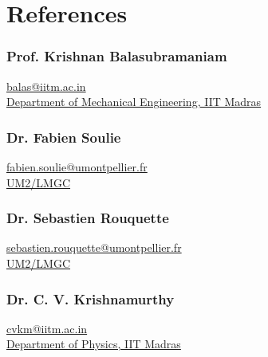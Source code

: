 \documentclass{my_cv}%
\begin{document}
\section{References}
\vspace{1em}
\begin{minipage}{0.6\textwidth}
\subsubsection{Prof. Krishnan Balasubramaniam} 
\faAt \hspace{0.2em} \href{mailto:balas@iitm.ac.in}{balas@iitm.ac.in} \\
\hspace{0.5em} \faInstitution \hspace{0.2em} \href{http://iitm.irins.org/profile/50968}{Department of Mechanical Engineering, IIT Madras}
\vspace{1.5em}
\subsubsection{Dr. Fabien Soulie} 
\faAt \hspace{0.2em} \href{mailto:fabien.soulie@umontpellier.fr}{fabien.soulie@umontpellier.fr}\\ \hspace{0.2em}\faInstitution \hspace{0.2em}  \href{http://www.lmgc.univ-montp2.fr/spip.php?page=pageperso&nom=SOULIE&prenom=Fabien&lang=fr}{UM2/LMGC}
\vspace{1em}
\end{minipage}
\begin{minipage}{0.6\textwidth}
\subsubsection{Dr. Sebastien Rouquette} 
\faAt \hspace{0.2em} \href{mailto:sebastien.rouquette@umontpellier.fr}{sebastien.rouquette@umontpellier.fr}\\ \faInstitution \hspace{0.2em} \href{http://www.lmgc.univ-montp2.fr/spip.php?page=pageperso&nom=ROUQUETTE&prenom=Sebastien&lang=fr}{UM2/LMGC}
\vspace{1.2em}
\subsubsection{Dr. C. V. Krishnamurthy} 
\faAt \hspace{0.2em} \href{mailto:cvkm@iitm.ac.in}{cvkm@iitm.ac.in} \\
\faInstitution \hspace{0.2em} \href{http://iitm.irins.org/profile/61936}{Department of Physics, IIT Madras}
\end{minipage}
\end{document}
